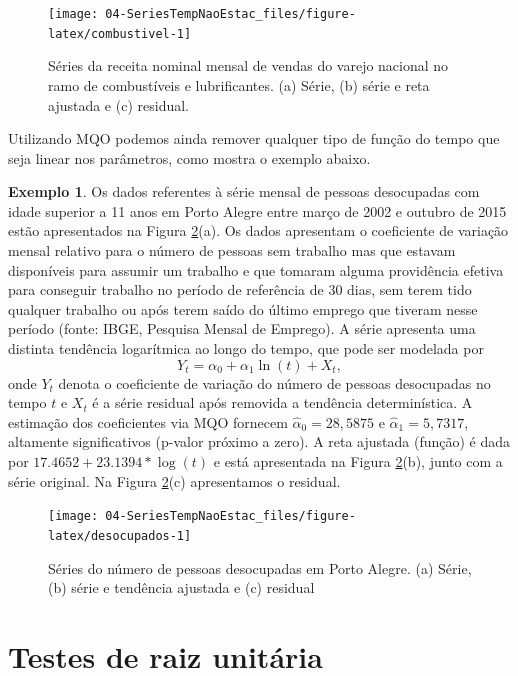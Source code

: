 \documentclass[
]{book}
\theoremstyle{definition}
\theoremstyle{definition}
\newtheorem{example}{Exemplo}[chapter]
\theoremstyle{definition}
\theoremstyle{remark}
\begin{document}
\begin{figure}
\texttt{[image: 04-SeriesTempNaoEstac\_files/figure-latex/combustivel-1]} \caption{Séries da receita nominal mensal de vendas do varejo nacional no ramo de combustíveis e lubrificantes. (a) Série, (b) série e reta ajustada e (c) residual.}\label{fig:combustivel}
\end{figure}

Utilizando MQO podemos ainda remover qualquer tipo de função do tempo que seja linear nos parâmetros, como mostra o exemplo abaixo.

\begin{example}
\protect\hypertarget{exm:desocup}{}{\label{exm:desocup} }Os dados referentes à série mensal de pessoas desocupadas com idade superior a 11 anos em Porto Alegre entre março de 2002 e outubro de 2015 estão apresentados na Figura \ref{fig:desocupados}(a). Os dados apresentam o coeficiente de variação mensal relativo para o número de pessoas sem trabalho mas que estavam disponíveis para assumir um trabalho e que tomaram alguma providência efetiva para conseguir trabalho no período de referência de 30 dias, sem terem tido qualquer trabalho ou após terem saído do último emprego que tiveram nesse período (fonte: IBGE, Pesquisa Mensal de Emprego). A série apresenta uma distinta tendência logarítmica ao longo do tempo, que pode ser modelada por
\[Y_t=\alpha_0+\alpha_1\ln(t)+X_t,\]
onde \(Y_t\) denota o coeficiente de variação do número de pessoas desocupadas no tempo \(t\) e \(X_t\) é a série residual após removida a tendência determinística. A estimação dos coeficientes via MQO fornecem \(\hat\alpha_0=28,5875\) e \(\hat\alpha_1=5,7317\), altamente significativos (p-valor próximo a zero). A reta ajustada (função) é dada por \(17.4652+23.1394*\log(t)\) e está apresentada na Figura \ref{fig:desocupados}(b), junto com a série original. Na Figura \ref{fig:desocupados}(c) apresentamos o residual.
\end{example}

\begin{figure}
\texttt{[image: 04-SeriesTempNaoEstac\_files/figure-latex/desocupados-1]} \caption{Séries do número de pessoas desocupadas em Porto Alegre. (a) Série, (b) série e tendência ajustada e (c) residual}\label{fig:desocupados}
\end{figure}

\hypertarget{testes-de-raiz-unituxe1ria}{%
\section{Testes de raiz unitária}\label{testes-de-raiz-unituxe1ria}}
\end{document}
